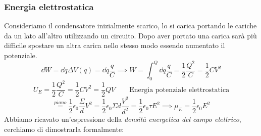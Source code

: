 \documentclass[12pt,a4paper]{article}
\begin{document}
\subsubsection{Energia elettrostatica}
Consideriamo il condensatore inizialmente scarico, lo si carica portando le cariche da un lato all'altro utilizzando un circuito. 
Dopo aver portato una carica sarà più difficile spostare un altra carica nello stesso modo essendo aumentato il potenziale.
\begin{equation*}
    \dd{W} = \dd{q} \Delta V(q) = \dd{q} \frac{q}{C} \implies W = \int_{0}^{Q} \dd{q} \frac{q}{C}= \frac{1}{2}\frac{Q^2}{C}= \frac{1}{2}CV^2
\end{equation*}
\begin{equation*}
    U_{E} = \frac{1}{2}\frac{Q^2}{C}= \frac{1}{2}CV^2 = \frac{1}{2}QV \qquad\text{Energia potenziale elettrostatica}
\end{equation*}
\begin{equation*}
    \overset{piano}{=} \frac{1}{2}\epsilon_0\frac{\Sigma}{d}V^2= \frac{1}{2}\epsilon_0\Sigma d \frac{V^2}{d^2}= \frac{1}{2} \epsilon_0\tau E^2
    \implies \mu_E = \frac{1}{2}\epsilon_0E^2
\end{equation*}
Abbiamo ricavato un'espressione della \textit{densità energetica del campo elettrico}, cerchiamo di dimostrarla formalmente:
\end{document}
